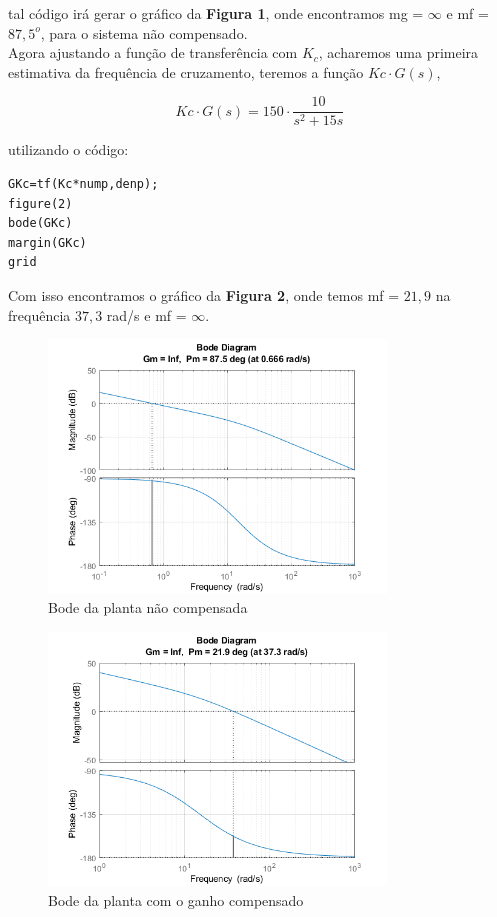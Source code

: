 tal código irá gerar o gráfico da \textbf{Figura 1}, onde encontramos mg = $\infty$ e mf = $87,5^o$, para o sistema não compensado.\\

Agora ajustando a função de transferência com $K_c$, acharemos uma primeira estimativa da frequência de cruzamento, teremos a função $Kc\cdot G(s)$,

\[ Kc\cdot G(s) = 150\cdot \dfrac{10}{s^2+15s} \]


\noindent utilizando o código:

\begin{lstlisting}[style=matlab]
GKc=tf(Kc*nump,denp);
figure(2)
bode(GKc)
margin(GKc)
grid
\end{lstlisting}\vspace{0.2cm}

Com isso encontramos o gráfico da \textbf{Figura 2}, onde temos {\color{red}mf = $21,9$ na frequência $37,3$ rad/s e mf = $\infty$}.

\begin{figure}[H]
  \centering
  \includegraphics[width=0.8\textwidth]{images/fig1.png}
  \caption{Bode da planta não compensada}
\end{figure}

\begin{figure}[H]
  \centering
  \includegraphics[width=0.8\textwidth]{images/fig2.png}
  \caption{Bode da planta com o ganho compensado}
\end{figure}
\newpage

